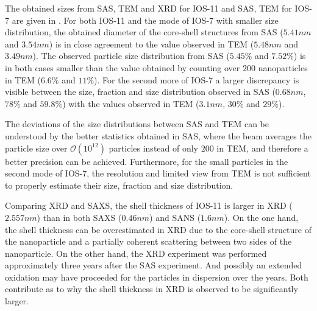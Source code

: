 \documentclass[\main/dresen_thesis.tex]{subfiles}
\begin{document}
    The obtained sizes from SAS, TEM and XRD for IOS-11 and SAS, TEM for IOS-7 are given in .
    For both IOS-11 and the mode of IOS-7 with smaller size distribution, the obtained diameter of the core-shell structures from SAS ($5.41 \unit{nm}$ and $3.54 \unit{nm}$) is in close agreement to the value observed in TEM ($5.48 \unit{nm}$ and $3.49 \unit{nm}$).
    The observed particle size distribution from SAS ($5.45 \unit{\%}$ and $7.52 \unit{\%}$) is in both cases smaller than the value obtained by counting over $200$ nanoparticles in TEM ($6.6 \unit{\%}$ and $11 \unit{\%}$).
    For the second more of IOS-7 a larger discrepancy is visible between the size, fraction and size distribution observed in SAS ($0.68 \unit{nm}$, $78 \unit{\%}$ and $59.8 \unit{\%}$) with the values observed in TEM ($3.1 \unit{nm}$, $30 \unit{\%}$ and $29 \unit{\%}$).

    The deviations of the size distributions between SAS and TEM can be understood by the better statistics obtained in SAS, where the beam averages the particle size over $\mathcal{O}(10^{12})$ particles instead of only $200$ in TEM, and therefore a better precision can be achieved.
    Furthermore, for the small particles in the second mode of IOS-7, the resolution and limited view from TEM is not sufficient to properly estimate their size, fraction and size distribution.

    Comparing XRD and SAXS, the shell thickness of IOS-11 is larger in XRD ($2.557 \unit{nm}$) than in both SAXS ($0.46 \unit{nm}$) and SANS ($1.6 \unit{nm}$).
    On the one hand, the shell thickness can be overestimated in XRD due to the core-shell structure of the nanoparticle and a partially coherent scattering between two sides of the nanoparticle.
    On the other hand, the XRD experiment was performed approximately three years after the SAS experiment.
    And possibly an extended oxidation may have proceeded for the particles in dispersion over the years.
    Both contribute as to why the shell thickness in XRD is observed to be significantly larger.
\end{document}
